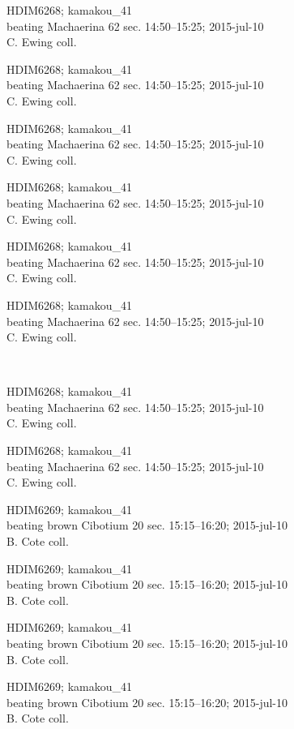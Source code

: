 \documentclass[2pt]{extarticle}
\begin{document}
\noindent
\parbox{0.16\textwidth}{\tiny \raggedright \rule[-0.3\baselineskip]{0pt}{10pt}HDIM6268; kamakou\_41\\ beating Machaerina 62 sec. 14:50--15:25; 2015-jul-10\\ C. Ewing coll.}
\parbox{0.16\textwidth}{\tiny \raggedright \rule[-0.3\baselineskip]{0pt}{10pt}HDIM6268; kamakou\_41\\ beating Machaerina 62 sec. 14:50--15:25; 2015-jul-10\\ C. Ewing coll.}
\parbox{0.16\textwidth}{\tiny \raggedright \rule[-0.3\baselineskip]{0pt}{10pt}HDIM6268; kamakou\_41\\ beating Machaerina 62 sec. 14:50--15:25; 2015-jul-10\\ C. Ewing coll.}
\parbox{0.16\textwidth}{\tiny \raggedright \rule[-0.3\baselineskip]{0pt}{10pt}HDIM6268; kamakou\_41\\ beating Machaerina 62 sec. 14:50--15:25; 2015-jul-10\\ C. Ewing coll.}
\parbox{0.16\textwidth}{\tiny \raggedright \rule[-0.3\baselineskip]{0pt}{10pt}HDIM6268; kamakou\_41\\ beating Machaerina 62 sec. 14:50--15:25; 2015-jul-10\\ C. Ewing coll.}
\parbox{0.16\textwidth}{\tiny \raggedright \rule[-0.3\baselineskip]{0pt}{10pt}HDIM6268; kamakou\_41\\ beating Machaerina 62 sec. 14:50--15:25; 2015-jul-10\\ C. Ewing coll.} \\ 
\vspace{0.001in} 

\noindent
\parbox{0.16\textwidth}{\tiny \raggedright \rule[-0.3\baselineskip]{0pt}{10pt}HDIM6268; kamakou\_41\\ beating Machaerina 62 sec. 14:50--15:25; 2015-jul-10\\ C. Ewing coll.}
\parbox{0.16\textwidth}{\tiny \raggedright \rule[-0.3\baselineskip]{0pt}{10pt}HDIM6268; kamakou\_41\\ beating Machaerina 62 sec. 14:50--15:25; 2015-jul-10\\ C. Ewing coll.}
\parbox{0.16\textwidth}{\tiny \raggedright \rule[-0.3\baselineskip]{0pt}{10pt}HDIM6269; kamakou\_41\\ beating brown Cibotium 20 sec. 15:15--16:20; 2015-jul-10\\ B. Cote coll.}
\parbox{0.16\textwidth}{\tiny \raggedright \rule[-0.3\baselineskip]{0pt}{10pt}HDIM6269; kamakou\_41\\ beating brown Cibotium 20 sec. 15:15--16:20; 2015-jul-10\\ B. Cote coll.}
\parbox{0.16\textwidth}{\tiny \raggedright \rule[-0.3\baselineskip]{0pt}{10pt}HDIM6269; kamakou\_41\\ beating brown Cibotium 20 sec. 15:15--16:20; 2015-jul-10\\ B. Cote coll.}
\parbox{0.16\textwidth}{\tiny \raggedright \rule[-0.3\baselineskip]{0pt}{10pt}HDIM6269; kamakou\_41\\ beating brown Cibotium 20 sec. 15:15--16:20; 2015-jul-10\\ B. Cote coll.} \\ 
\vspace{0.001in} 
\end{document}
